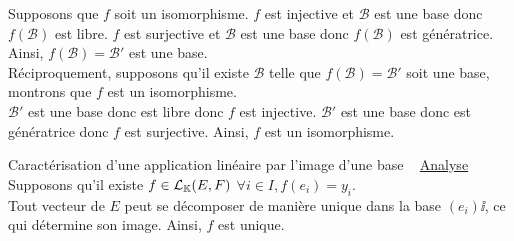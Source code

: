 \documentclass{article}
\begin{document}
\begin{question_kholle}
	Supposons que $f$ soit un isomorphisme. $f$ est injective et $\mathcal{B}$ est une base donc $f(\mathcal{B})$ est libre. $f$ est surjective et $\mathcal{B}$ est une base donc $f(\mathcal{B})$ est génératrice. Ainsi, $f(\mathcal{B})=\mathcal{B}'$ est une base. \\
	Réciproquement, supposons qu'il existe $\mathcal{B}$ telle que $f(\mathcal{B})=\mathcal{B}'$ soit une base, montrons que $f$ est un isomorphisme.\\
	$\mathcal{B}'$ est une base donc est libre donc $f$ est injective. $\mathcal{B}'$ est une base donc est génératrice donc $f$ est surjective.
	Ainsi, $f$ est un isomorphisme.
\end{question_kholle}

\begin{question_kholle}
	[Il existe une unique application linéaire de $E$ dans $F$ qui envoie une base donnée de $E$ sur une famille de $F$ imposée. \\
		Soient $(e_i)\ii$ une base de $E$ et $(y_i)\ii$ une famille de $F$.
		\begin{equation}
			\exists ! f \in \mathcal{L}_\K(E, F) : \forall i \in I, f(e_i) = y_i
		\end{equation}
		Nous pouvons expliciter une telle application :
		\begin{equation}
			f \left| \;\; \begin{matrix}
				E                                          & \rightarrow & F                                          \\
				\displaystyle \sum\ii \lambda_i \ldotp e_i & \mapsto     & \displaystyle \sum\ii \lambda_i \ldotp y_i
			\end{matrix} \right.
		\end{equation}]
	{Caractérisation d'une application linéaire par l'image d'une base}
	~\newline
	\underline{Analyse} Supposons qu'il existe $f \in \mathcal{L}_{\mathbb K}(E, F)$ \tq $\forall i \in I, f(e_i) = y_i$. \\
	Tout vecteur de $E$ peut se décomposer de manière unique dans la base $(e_i)\ii$, ce qui détermine son image. Ainsi, $f$ est unique.
	\newline


\end{question_kholle}
\end{document}
